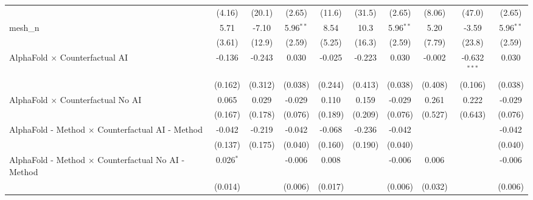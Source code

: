 \begin{tabular}{lccccccccc}
                                                               & (4.16)        & (20.1)        & (2.65)        & (11.6)       & (31.5)        & (2.65)        & (8.06)        & (47.0)         & (2.65)\\   
   mesh\_n                                                     & 5.71          & -7.10         & 5.96$^{**}$   & 8.54         & 10.3          & 5.96$^{**}$   & 5.20          & -3.59          & 5.96$^{**}$\\   
                                                               & (3.61)        & (12.9)        & (2.59)        & (5.25)       & (16.3)        & (2.59)        & (7.79)        & (23.8)         & (2.59)\\   
   AlphaFold $\times$ Counterfactual AI                        & -0.136        & -0.243        & 0.030         & -0.025       & -0.223        & 0.030         & -0.002        & -0.632$^{***}$ & 0.030\\   
                                                               & (0.162)       & (0.312)       & (0.038)       & (0.244)      & (0.413)       & (0.038)       & (0.408)       & (0.106)        & (0.038)\\   
   AlphaFold $\times$ Counterfactual No AI                     & 0.065         & 0.029         & -0.029        & 0.110        & 0.159         & -0.029        & 0.261         & 0.222          & -0.029\\   
                                                               & (0.167)       & (0.178)       & (0.076)       & (0.189)      & (0.209)       & (0.076)       & (0.527)       & (0.643)        & (0.076)\\   
   AlphaFold - Method $\times$ Counterfactual AI - Method      & -0.042        & -0.219        & -0.042        & -0.068       & -0.236        & -0.042        &               &                & -0.042\\   
                                                               & (0.137)       & (0.175)       & (0.040)       & (0.160)      & (0.190)       & (0.040)       &               &                & (0.040)\\   
   AlphaFold - Method $\times$ Counterfactual No AI - Method   & 0.026$^{*}$   &               & -0.006        & 0.008        &               & -0.006        & 0.006         &                & -0.006\\   
                                                               & (0.014)       &               & (0.006)       & (0.017)      &               & (0.006)       & (0.032)       &                & (0.006)\\   

\end{tabular}
